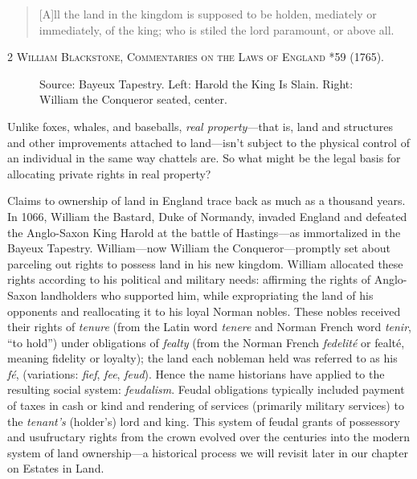 \begin{quote}
 [A]ll the land in the kingdom is supposed to be holden, mediately or
immediately, of the king; who is stiled the lord paramount, or above all.
\end{quote}
2 \textsc{William Blackstone, Commentaries on the Laws of
England} *59 (1765).

\begin{figure}
\begin{center}
\end{center}
\caption{Source: Bayeux Tapestry. Left: Harold the King Is Slain.
Right: William the Conqueror seated, center.}
\end{figure}

Unlike foxes, whales, and baseballs, \textit{real property}---that is, land and
structures and other improvements attached to land---isn't subject to the
physical control of an individual in the same way chattels are. So what might be
the legal basis for allocating private rights in real property? 

Claims to ownership of land in England trace back as much as a thousand years.
In 1066, William the Bastard, Duke of Normandy, invaded England and defeated the
Anglo-Saxon King Harold at the battle of Hastings---as immortalized in the
Bayeux Tapestry. William---now William the Conqueror---promptly set about
parceling out rights to possess land in his new kingdom. William allocated these
rights according to his political and military needs: affirming the rights of
Anglo-Saxon landholders who supported him, while expropriating the land of his
opponents and reallocating it to his loyal Norman nobles. These nobles received
their rights of \textit{tenure} (from the Latin word \textit{tenere} and Norman
French word \textit{tenir}, ``to hold'') under obligations of \textit{fealty}
(from the Norman French \textit{fedelit\'e} or {fealt\'e}, meaning fidelity or
loyalty); the land each nobleman held was referred to as his \textit{f\'e},
(variations: \textit{fief}, \textit{fee}, \textit{feud}). Hence the name
historians have applied to the resulting social system: \textit{feudalism}.
Feudal obligations typically included payment of taxes in cash or kind and
rendering of services (primarily military services) to the \textit{tenant's}
(holder's) lord and king. This system of feudal grants of possessory and
usufructary rights from the crown evolved over the centuries into the modern
system of land ownership---a historical process we will revisit later in our
chapter on Estates in Land.

